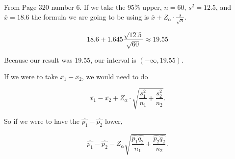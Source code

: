\chapter{}

\section{}

\section{}

\section{}

	\begin{problem}
		From Page 320 number 6. If we take the 95\% upper, $n=60$, $s^2=12.5$, and $\overline{x}=18.6$ the formula we are going to be using is $\overline{x}+Z_\alpha\cdot \frac{s}{\sqrt{n} }$.

		\begin{equation}
			18.6+1.645 \frac{\sqrt{12.5}}{\sqrt{60}}\approx19.55
		\end{equation}

		Because our result was 19.55, our interval is $(-\infty, 19.55)$.
	\end{problem}

	If we were to take $\overline{x_1}-\overline{x_2}$, we would need to do 

	\begin{equation}
		\overline{x_1}-\overline{x_2}+Z_\alpha\cdot \sqrt{\frac{s_1^2}{n_1}+\frac{s_2^2}{n_2}}.
	\end{equation}

	So if we were to have the $\hat{p_1}-\hat{p_2}$ lower,

	\begin{equation}
		\hat{p_1}-\hat{p_2}-Z_\alpha\sqrt{\frac{\hat{p_1}\hat{q_2}}{n_1}+\frac{\hat{p_2}\hat{q_2}}{n_2}}.
	\end{equation}


